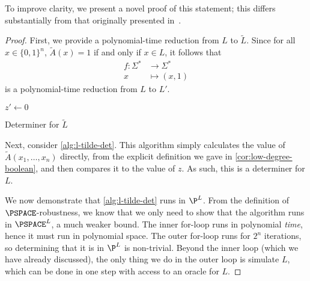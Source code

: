 \documentclass[english,12pt]{reedthesis}
\theoremstyle{plain}
\theoremstyle{definition}
\theoremstyle{remark}
\begin{document}
To improve clarity, we present a novel proof of this statement; this differs
substantially from that originally presented in~\cite{BFL90}.

\begin{proof}
  First, we provide a polynomial-time reduction from $L$ to $\tilde{L}$. Since
  for all $x \in \{0, 1\}^{n}$, $\tilde{A}(x) = 1$ if and only if $x \in L$, it
  follows that
  \begin{equation}
    \begin{aligned}
      f\colon \Sigma^{*} &\rightarrow \Sigma^{*} \\
      x &\mapsto (x, 1)
    \end{aligned}
  \end{equation}
  is a polynomial-time reduction from $L$ to $L'$.

  \begin{algorithm}[htbp]
    $z' \leftarrow 0$\;
    \;
    \caption{Determiner for $\tilde{L}$}\label{alg:l-tilde-det}
  \end{algorithm}

  Next, consider \cref{alg:l-tilde-det}. This algorithm simply calculates the
  value of $\tilde{A}(x_{1}, \ldots, x_{n})$ directly, from the explicit definition
  we gave in \cref{cor:low-degree-boolean}, and then compares it to the value of
  $z$. As such, this is a determiner for $L$.

  We now demonstrate that \cref{alg:l-tilde-det} runs in $\P^{L}$. From the
  definition of $\PSPACE$-robustness, we know that we only need to show that the
  algorithm runs in $\PSPACE^{L}$, a much weaker bound. The inner for-loop runs
  in polynomial \emph{time}, hence it must run in polynomial space. The outer
  for-loop runs for $2^{n}$ iterations, so determining that it is in $\P^{L}$ is
  non-trivial. Beyond the inner loop (which we have already discussed), the only
  thing we do in the outer loop is simulate $L$, which can be done in one step
  with access to an oracle for $L$.


\end{proof}
\end{document}
